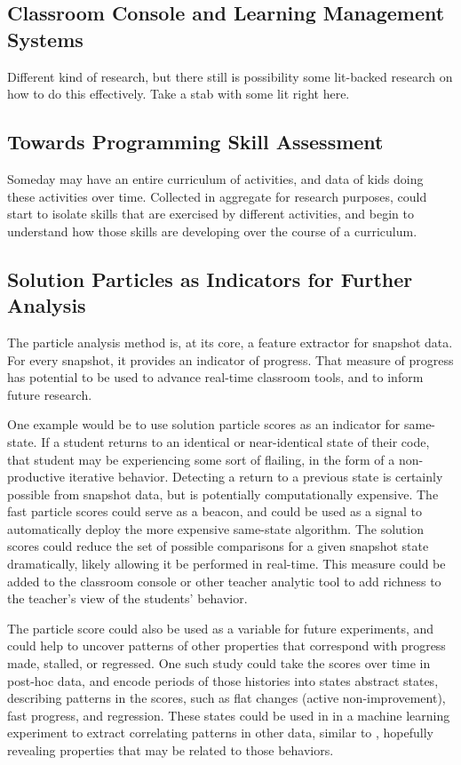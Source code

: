 \subsection{Classroom Console and Learning Management Systems}
Different kind of research, but there still is possibility some lit-backed research on how to do this effectively. Take a stab with some lit right here.

\subsection{Towards Programming Skill Assessment}
Someday may have an entire curriculum of activities, and data of kids doing these activities over time. Collected in aggregate for research purposes, could start to isolate skills that are exercised by different activities, and begin to understand how those skills are developing over the course of a curriculum.

\subsection{Solution Particles as Indicators for Further Analysis}
The particle analysis method is, at its core, a feature extractor for snapshot data. For every snapshot, it provides an indicator of progress. That measure of progress has potential to be used to advance real-time classroom tools, and to inform future research. 

One example would be to use solution particle scores as an indicator for same-state. If a student returns to an identical or near-identical state of their code, that student may be experiencing some sort of flailing, in the form of a non-productive iterative behavior. Detecting a return to a previous state is certainly possible from snapshot data, but is potentially computationally expensive. The fast particle scores could serve as a beacon, and could be used as a signal to automatically deploy the more expensive same-state algorithm. The solution scores could reduce the set of possible comparisons for a given snapshot state dramatically, likely allowing it be performed in real-time. This measure could be added to the classroom console or other teacher analytic tool to add richness to the teacher's view of the students' behavior. 

The particle score could also be used as a variable for future experiments, and could help to uncover patterns of other properties that correspond with progress made, stalled, or regressed. One such study could take the scores over time in post-hoc data, and encode periods of those histories into states abstract states, describing patterns in the scores, such as flat changes (active non-improvement), fast progress, and regression. These states could be used in in a machine learning experiment to extract correlating patterns in other data, similar to \citet{tissenbaummodeling}, hopefully revealing properties that may be related to those behaviors.

